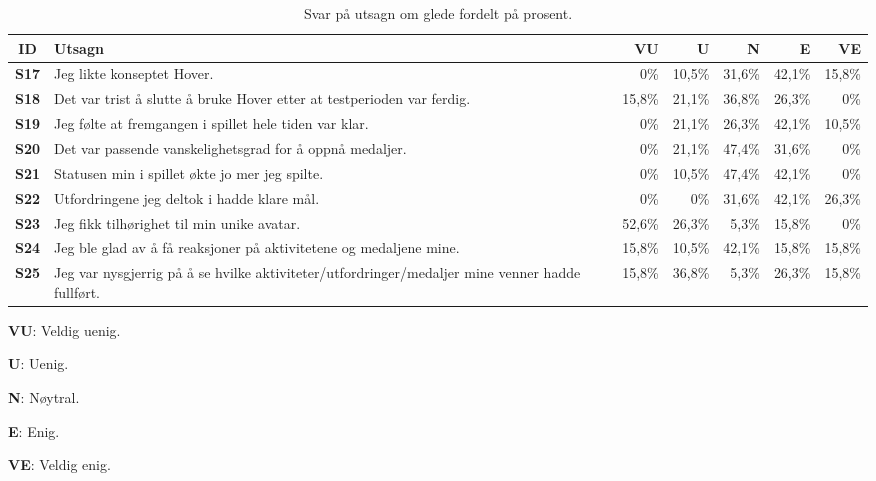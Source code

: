 \begin{table}[H]     
    \small
    \begin{threeparttable}[t]
    \begin{tabularx}{\textwidth}{|>{\bfseries}c|X|r|r|r|r|r|}
        \hline   \textbf{ID} &  \textbf{Utsagn} & \textbf{VU }  &  \textbf{U}  &  \textbf{N}  &  \textbf{E}  &  \textbf{VE}  \\ \hline
        S17 & Jeg likte konseptet Hover.  & 0\% & 10,5\% & 31,6\% & 42,1\% & 15,8\% \\ 
        S18 & Det var trist å slutte å bruke Hover etter at testperioden var ferdig.  & 15,8\% & 21,1\% & 36,8\% & 26,3\% & 0\% \\ 
        S19 & Jeg følte at fremgangen i spillet hele tiden var klar.  & 0\% & 21,1\% & 26,3\% & 42,1\% & 10,5\% \\ 
        S20 & Det var passende vanskelighetsgrad for å oppnå medaljer.  & 0\% & 21,1\% & 47,4\% & 31,6\% & 0\% \\ 
        S21 & Statusen min i spillet økte jo mer jeg spilte.  & 0\% & 10,5\% & 47,4\% & 42,1\% & 0\% \\ 
        S22 & Utfordringene jeg deltok i hadde klare mål.  & 0\% & 0\% & 31,6\% & 42,1\% & 26,3\% \\ 
        S23 & Jeg fikk tilhørighet til min unike avatar.  & 52,6\% & 26,3\% & 5,3\% & 15,8\% & 0\% \\ 
        S24 & Jeg ble glad av å få reaksjoner på aktivitetene og medaljene mine.  & 15,8\% & 10,5\% & 42,1\% & 15,8\% & 15,8\% \\ 
        S25 & Jeg var nysgjerrig på å se hvilke aktiviteter/utfordringer/medaljer mine venner hadde fullført.  & 15,8\% & 36,8\% & 5,3\% & 26,3\% & 15,8\% \\
         \hline
    \end{tabularx}
    \begin{tablenotes}
    \scriptsize
     \item[] \textbf{VU}: Veldig uenig.
     \item[] \textbf{U}: Uenig.
     \item[] \textbf{N}: Nøytral.
     \item[] \textbf{E}: Enig.
     \item[] \textbf{VE}: Veldig enig.
   \end{tablenotes}
   \end{threeparttable}
    \caption{Svar på utsagn om glede fordelt på prosent.}
\end{table}


